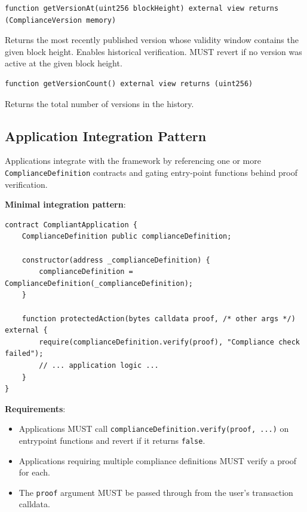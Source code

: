 \documentclass[9pt]{extreport}
\begin{document}
\vspace{2em}
\begin{singlespace}
\begin{lstlisting}[language=Solidity]
function getVersionAt(uint256 blockHeight) external view returns (ComplianceVersion memory)
\end{lstlisting}
\end{singlespace}

Returns the most recently published version whose validity window contains the given block height. Enables historical verification. MUST revert if no version was active at the given block height.

\vspace{2em}
\begin{lstlisting}[language=Solidity]
function getVersionCount() external view returns (uint256)
\end{lstlisting}

Returns the total number of versions in the history.

\subsection{Application Integration Pattern}
\label{sec:application-integration}

Applications integrate with the framework by referencing one or more \\\texttt{ComplianceDefinition} contracts and gating entry-point functions behind proof verification.

\textbf{Minimal integration pattern}:

\begin{singlespace}
\begin{lstlisting}[language=Solidity]
contract CompliantApplication {
    ComplianceDefinition public complianceDefinition;

    constructor(address _complianceDefinition) {
        complianceDefinition = ComplianceDefinition(_complianceDefinition);
    }

    function protectedAction(bytes calldata proof, /* other args */) external {
        require(complianceDefinition.verify(proof), "Compliance check failed");
        // ... application logic ...
    }
}
\end{lstlisting}
\end{singlespace}

\textbf{Requirements}:
\begin{itemize}
    \item Applications MUST call \texttt{complianceDefinition.verify(proof, ...)} on entrypoint functions and revert if it returns \texttt{false}.
    \item Applications requiring multiple compliance definitions MUST verify a proof for each.
    \item The \texttt{proof} argument MUST be passed through from the user's transaction calldata.
\end{itemize}
\end{document}
